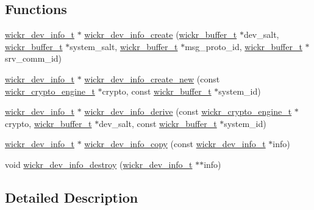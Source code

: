 \subsection*{Functions}
\begin{DoxyCompactItemize}
\item 
\mbox{\hyperlink{structwickr__dev__info}{wickr\+\_\+dev\+\_\+info\+\_\+t}} $\ast$ \mbox{\hyperlink{group__wickr__dev__info_gaadd5ceb4c6ed757440332e8e27109e5e}{wickr\+\_\+dev\+\_\+info\+\_\+create}} (\mbox{\hyperlink{structwickr__buffer}{wickr\+\_\+buffer\+\_\+t}} $\ast$dev\+\_\+salt, \mbox{\hyperlink{structwickr__buffer}{wickr\+\_\+buffer\+\_\+t}} $\ast$system\+\_\+salt, \mbox{\hyperlink{structwickr__buffer}{wickr\+\_\+buffer\+\_\+t}} $\ast$msg\+\_\+proto\+\_\+id, \mbox{\hyperlink{structwickr__buffer}{wickr\+\_\+buffer\+\_\+t}} $\ast$srv\+\_\+comm\+\_\+id)
\item 
\mbox{\hyperlink{structwickr__dev__info}{wickr\+\_\+dev\+\_\+info\+\_\+t}} $\ast$ \mbox{\hyperlink{group__wickr__dev__info_gadbe4731cffb188da317ed9237826ac5d}{wickr\+\_\+dev\+\_\+info\+\_\+create\+\_\+new}} (const \mbox{\hyperlink{structwickr__crypto__engine}{wickr\+\_\+crypto\+\_\+engine\+\_\+t}} $\ast$crypto, const \mbox{\hyperlink{structwickr__buffer}{wickr\+\_\+buffer\+\_\+t}} $\ast$system\+\_\+id)
\item 
\mbox{\hyperlink{structwickr__dev__info}{wickr\+\_\+dev\+\_\+info\+\_\+t}} $\ast$ \mbox{\hyperlink{group__wickr__dev__info_ga7f81b96fc222560762d608772b3f44bd}{wickr\+\_\+dev\+\_\+info\+\_\+derive}} (const \mbox{\hyperlink{structwickr__crypto__engine}{wickr\+\_\+crypto\+\_\+engine\+\_\+t}} $\ast$crypto, \mbox{\hyperlink{structwickr__buffer}{wickr\+\_\+buffer\+\_\+t}} $\ast$dev\+\_\+salt, const \mbox{\hyperlink{structwickr__buffer}{wickr\+\_\+buffer\+\_\+t}} $\ast$system\+\_\+id)
\item 
\mbox{\hyperlink{structwickr__dev__info}{wickr\+\_\+dev\+\_\+info\+\_\+t}} $\ast$ \mbox{\hyperlink{group__wickr__dev__info_ga1c9d2bdc1778166c49aec43906bb1a83}{wickr\+\_\+dev\+\_\+info\+\_\+copy}} (const \mbox{\hyperlink{structwickr__dev__info}{wickr\+\_\+dev\+\_\+info\+\_\+t}} $\ast$info)
\item 
void \mbox{\hyperlink{group__wickr__dev__info_ga09ee324a0e0e6a0451aa53031eecb324}{wickr\+\_\+dev\+\_\+info\+\_\+destroy}} (\mbox{\hyperlink{structwickr__dev__info}{wickr\+\_\+dev\+\_\+info\+\_\+t}} $\ast$$\ast$info)
\end{DoxyCompactItemize}


\subsection{Detailed Description}


